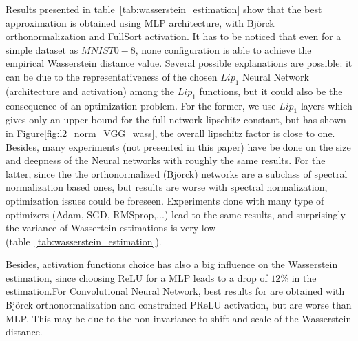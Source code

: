 Results presented in table~\ref{tab:wasserstein_estimation} show that the best approximation is obtained using MLP architecture, with Bj\"orck orthonormalization and FullSort activation. It has to be noticed that even for a simple dataset as $MNIST 0-8$, none configuration is able to achieve the empirical Wasserstein distance value. Several possible explanations are possible: it can be due to the representativeness of the chosen $Lip_1$ Neural Network (architecture and activation)  among the $Lip_1$ functions, but it could also be the consequence of an optimization problem. For the former, we use $Lip_1$ layers which gives only an upper bound for the full network lipschitz constant, but has shown in Figure\ref{fig:l2_norm_VGG_wass}, the overall lipschitz factor is close to one. Besides, many experiments (not presented in this paper) have be done on the size and deepness of the Neural networks with roughly the same results. 
For the latter, since the the orthonormalized (Bj\"orck) networks are a subclass of spectral normalization based ones, but results are worse with spectral normalization, optimization issues could be foreseen.  %
Experiments done with many type  of optimizers (Adam, SGD, RMSprop,...) lead to the same results, and surprisingly the variance of Wassertein estimations is very low (table~\ref{tab:wasserstein_estimation}). %

Besides, activation functions choice has also a big influence on the Wasserstein estimation, since choosing ReLU for a MLP leads to a drop of $12\%$ in the estimation.For Convolutional Neural Network, best results for  are obtained with Bj\"orck orthonormalization and constrained PReLU activation, but are worse than MLP. This may be due to the non-invariance to shift and scale of the Wasserstein distance.

